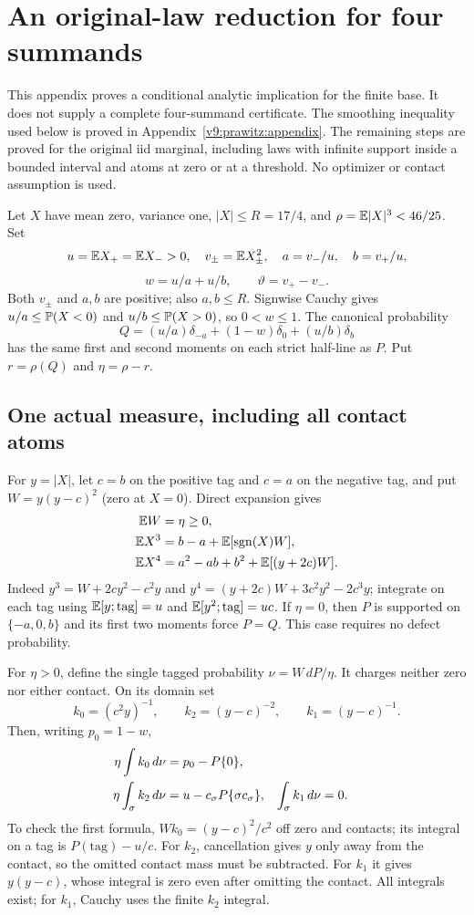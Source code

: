 \section{An original-law reduction for four summands}
\label{r4bridge:section}

This appendix proves a conditional analytic implication for the finite base.
It does not supply a complete four-summand certificate. The smoothing
inequality used below is proved in Appendix~\ref{v9:prawitz:appendix}. The remaining steps are proved for the original iid marginal, including laws with
infinite support inside a bounded interval and atoms at zero or at a
threshold. No optimizer or contact assumption is used.

Let $X$ have mean zero, variance one, $|X|\le R=17/4$, and
$\rho=\mathbb E|X|^3<46/25$. Set
\[
 u=\mathbb E X_+=\mathbb E X_->0,\quad v_\pm=\mathbb E X_\pm^2,
 \quad a=v_-/u,\quad b=v_+/u,
\]
\[
 w=u/a+u/b,\qquad \vartheta=v_+-v_-.
\]
Both $v_\pm$ and $a,b$ are positive; also $a,b\le R$.
Signwise Cauchy gives $u/a\le\mathbb P(X<0)$ and
$u/b\le\mathbb P(X>0)$, so $0<w\le1$. The canonical probability
\[
 Q=(u/a)\delta_{-a}+(1-w)\delta_0+(u/b)\delta_b
\]
has the same first and second moments on each strict half-line as $P$.
Put $r=\rho(Q)$ and $\eta=\rho-r$.

\subsection{One actual measure, including all contact atoms}
For $y=|X|$, let $c=b$ on the positive tag and $c=a$ on the
negative tag, and put $W=y(y-c)^2$ (zero at $X=0$). Direct expansion gives
\begin{align}
 \mathbb E W&=\eta\ge0,\label{r4bridge:excess}\\
 \mathbb E X^3&=b-a+\mathbb E[\operatorname{sgn}(X)W],\notag\\
 \mathbb E X^4&=a^2-ab+b^2+\mathbb E[(y+2c)W].\label{r4bridge:moments}
\end{align}
Indeed $y^3=W+2cy^2-c^2y$ and
$y^4=(y+2c)W+3c^2y^2-2c^3y$; integrate on each tag using
$\mathbb E[y;\text{tag}]=u$ and $\mathbb E[y^2;\text{tag}]=uc$.
If $\eta=0$, then $P$ is supported on $\{-a,0,b\}$ and its
first two moments force $P=Q$. This case requires no defect probability.

For $\eta>0$, define the single tagged probability $\nu=W\,dP/\eta$.
It charges neither zero nor either contact. On its domain set
\[
 k_0=(c^2y)^{-1},\qquad k_2=(y-c)^{-2},\qquad k_1=(y-c)^{-1}.
\]
Then, writing $p_0=1-w$,
\begin{align}
 \eta\int k_0\,d\nu&=p_0-P\{0\},\notag\\
 \eta\int_{\sigma} k_2\,d\nu&=u-c_\sigma P\{\sigma c_\sigma\},
 &\int_{\sigma}k_1\,d\nu&=0.\label{r4bridge:budgets}
\end{align}
To check the first formula, $Wk_0=(y-c)^2/c^2$ off zero and
contacts; its integral on a tag is $P(\text{tag})-u/c$.
For $k_2$, cancellation gives $y$ only away from the contact,
so the omitted contact mass must be subtracted. For $k_1$ it gives
$y(y-c)$, whose integral is zero even after omitting the contact.
All integrals exist; for $k_1$, Cauchy uses the finite $k_2$ integral.


